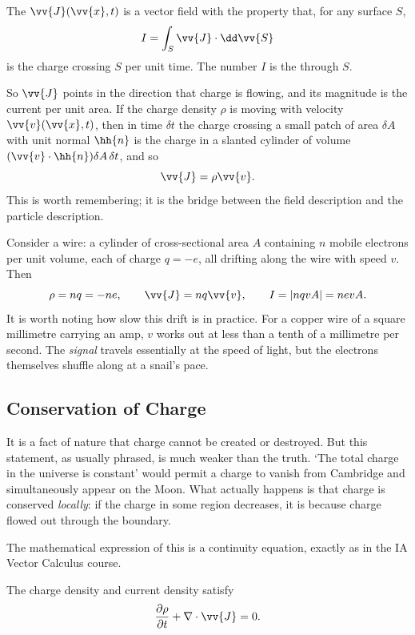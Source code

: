 \begin{definition}
	The  $\vv{J}(\vv{x}, t)$ is a vector field with the property that, for any surface $S$,
	$$
	I = \int_S \vv{J} \cdot \dd \vv{S}
	$$
	is the charge crossing $S$ per unit time. The number $I$ is the  through $S$.
\end{definition}

So $\vv{J}$ points in the direction that charge is flowing, and its magnitude is the current per unit area. If the charge density $\rho$ is moving with velocity $\vv{v}(\vv{x}, t)$, then in time $\delta t$ the charge crossing a small patch of area $\delta A$ with unit normal $\hh{n}$ is the charge in a slanted cylinder of volume $(\vv{v} \cdot \hh{n})\delta A \, \delta t$, and so
$$
\vv{J} = \rho \vv{v}.
$$
This is worth remembering; it is the bridge between the field description and the particle description.

\begin{example}
	Consider a wire: a cylinder of cross-sectional area $A$ containing $n$ mobile electrons per unit volume, each of charge $q = -e$, all drifting along the wire with speed $v$. Then
	$$
	\rho = nq = -ne, \qquad \vv{J} = nq \vv{v}, \qquad I = |nqvA| = nevA.
	$$
	It is worth noting how slow this drift is in practice. For a copper wire of a square millimetre carrying an amp, $v$ works out at less than a tenth of a millimetre per second. The \emph{signal} travels essentially at the speed of light, but the electrons themselves shuffle along at a snail's pace.
\end{example}

\subsection{Conservation of Charge}

It is a fact of nature that charge cannot be created or destroyed. But this statement, as usually phrased, is much weaker than the truth. `The total charge in the universe is constant' would permit a charge to vanish from Cambridge and simultaneously appear on the Moon. What actually happens is that charge is conserved \emph{locally}: if the charge in some region decreases, it is because charge flowed out through the boundary.

The mathematical expression of this is a continuity equation, exactly as in the IA Vector Calculus course.

\begin{law}
	The charge density and current density satisfy
	$$
	\frac{\partial \rho}{\partial t} + \nabla \cdot \vv{J} = 0.
	$$
\end{law}

